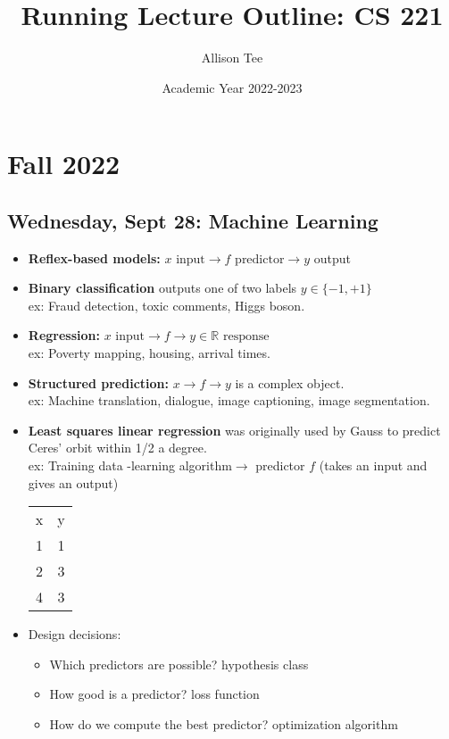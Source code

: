 \documentclass[10pt, oneside]{article}
\title{Running Lecture Outline: CS 221}
\author{Allison Tee}
\date{Academic Year 2022-2023}
\begin{document}
\maketitle
\tableofcontents

\vspace{.25in}

\section{Fall 2022}

\subsection{Wednesday, Sept 28: Machine Learning}

\begin{itemize}

\item {\bf Reflex-based models:} $x \text{ input} \to f \text{ predictor} \to y$ output

\item {\bf Binary classification} outputs one of two labels $y \in \{ -1, +1\}$\\
ex: Fraud detection, toxic comments, Higgs boson.

\item {\bf Regression:} $x \text{ input} \to f \to y \in \mathbb{R} \text{ response}$\\
ex: Poverty mapping, housing, arrival times.\\

\item {\bf Structured prediction:} $x \to f \to y$ is a complex object.\\
ex: Machine translation, dialogue, image captioning, image segmentation.\\

\item {\bf Least squares linear regression} was originally used by Gauss to predict Ceres' orbit within 1/2 a degree.\\
ex: Training data -learning algorithm$\to$ predictor $f$ (takes an input and gives an output)\\
\begin{tabular}{ c c }
x & y \\ 
1 & 1 \\  
2 & 3 \\
4 & 3
\end{tabular}

\item Design decisions:
\begin{itemize}
\item Which predictors are possible? hypothesis class
\item How good is a predictor? loss function
\item How do we compute the best predictor? optimization algorithm
\end{itemize}


\end{itemize}
\end{document}
